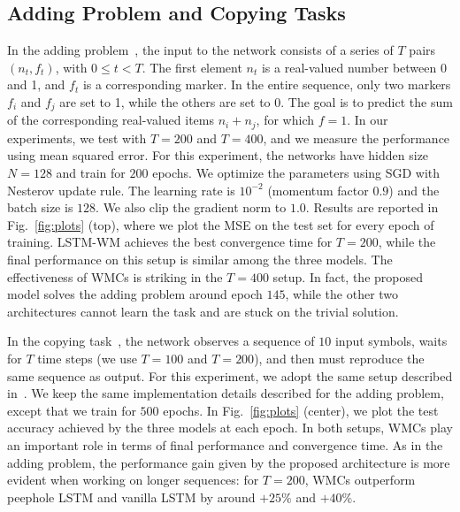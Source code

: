 \subsection{Adding Problem and Copying Tasks}
In the adding problem~\citep{hochreiter1997long}, the input to the network consists of a series of $T$ pairs $(n_t, f_t)$, with $0\le t<T$. The first element $n_t$ is a real-valued number between 0 and 1, and $f_t$ is a corresponding marker. In the entire sequence, only two markers $f_i$ and $f_j$ are set to 1, while the others are set to 0. The goal is to predict the sum of the corresponding real-valued items $n_i + n_j$, for which $f = 1$. In our experiments, we test with $T=200$ and $T=400$, and we measure the performance using mean squared error.
%
For this experiment, the networks have hidden size $N=128$ and train for $200$ epochs. We optimize the parameters using SGD with Nesterov update rule. The learning rate is $10^{-2}$ (momentum factor $0.9$) and the batch size is $128$. We also clip the gradient norm to $1.0$.
%
Results are reported in Fig.~\ref{fig:plots} (top), where we plot the MSE on the test set for every epoch of training.
LSTM-WM achieves the best convergence time for $T=200$, while the final performance on this setup is similar among the three models. The effectiveness of WMCs is striking in the $T=400$ setup. In fact, the proposed model solves the adding problem around epoch $145$, while the other two architectures cannot learn the task and are stuck on the trivial solution.

In the copying task~\citep{hochreiter1997long}, the network observes a sequence of $10$ input symbols, waits for $T$ time steps (we use $T=100$ and $T=200$), and then must reproduce the same sequence as output. For this experiment, we adopt the same setup described in~\citep{arjovsky2016unitary}.
We keep the same implementation details described for the adding problem, except that we train for $500$ epochs.
In Fig.~\ref{fig:plots} (center), we plot the test accuracy achieved by the three models at each epoch. In both setups, WMCs play an important role in terms of final performance and convergence time. As in the adding problem, the performance gain given by the proposed architecture is more evident when working on longer sequences: for $T=200$, WMCs outperform peephole LSTM and vanilla LSTM by around $+25\%$ and $+40\%$.


